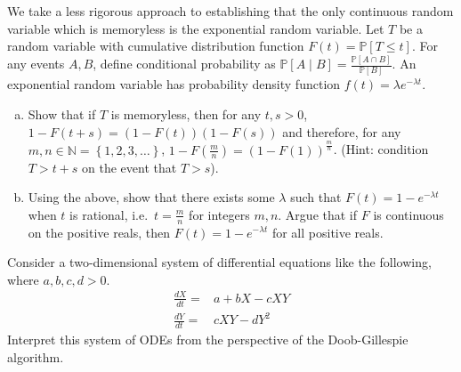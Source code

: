 \begin{exercises}
\item \label{ex:hw_memoryless_elementary}
We take a less rigorous approach to establishing that the only continuous random variable which is memoryless is the exponential random variable. Let $T$ be a random variable with cumulative distribution function $F(t) = \mathbb{P}[T \leq t]$. For any events $A, B$, define conditional probability as $\mathbb{P}[A \mid B] = \frac{\mathbb{P}[A \cap B]}{\mathbb{P}[B]}$. An exponential random variable has probability density function $f(t) = \lambda e^{-\lambda t}$.
\begin{enumerate}[(a)]
\item Show that if $T$ is memoryless, then for any $t, s > 0$, $1-F(t+s) = (1-F(t))(1-F(s))$ and therefore, for any $m, n \in \mathbb{N} = \left\{1, 2, 3, \ldots\right\}$, $1-F(\frac{m}{n}) = (1-F(1))^{\frac{m}{n}}$. (Hint: condition $T > t+s$ on the event that $T > s$).
\item Using the above, show that there exists some $\lambda$ such that $F(t) = 1-e^{-\lambda t}$ when $t$ is rational, i.e.\ $t = \frac{m}{n}$ for integers $m, n$. Argue that if $F$ is continuous on the positive reals, then $F(t) = 1-e^{-\lambda t}$ for all positive reals.
\end{enumerate}

\item \label{ex:hw_doob_gillespie_interp}
Consider a two-dimensional system of differential equations like the following, where $a, b, c, d > 0$.
\begin{align*}
\frac{dX}{dt} =& a + bX - cXY \\
\frac{dY}{dt} =& cXY - dY^2
\end{align*}
Interpret this system of ODEs from the perspective of the Doob-Gillespie algorithm.


\end{exercises}
